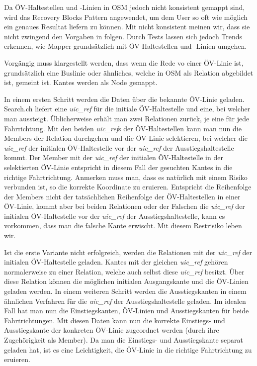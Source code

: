 Da ÖV-Haltestellen und -Linien in \ac{OSM} jedoch nicht konsistent gemappt sind, wird das Recovery Blocks Pattern \cite{fault_tolerant_software} angewendet, um dem User so oft wie möglich ein genaues Resultat liefern zu können. Mit nicht konsistent meinen wir, dass sie nicht zwingend den Vorgaben in \cite{osm_wiki_relation} folgen. Durch Tests lassen sich jedoch Trends erkennen, wie Mapper grundsätzlich mit ÖV-Haltestellen und -Linien umgehen.

Vorgängig muss klargestellt werden, dass wenn die Rede vo einer ÖV-Linie ist, grundsätzlich eine Buslinie oder ähnliches, welche in \ac{OSM} als Relation \cite{osm_wiki_relation} abgebildet ist, gemeint ist. \glspl{Kante} werden als Node gemappt.

In einem ersten Schritt werden die Daten über die bekannte ÖV-Linie geladen. Search.ch \cite{search_ch_route_api} liefert eine \emph{uic\_ref} für die initiale ÖV-Haltestelle und eine, bei welcher man aussteigt. Üblicherweise erhält man zwei Relationen zurück, je eine für jede Fahrrichtung. Mit den beiden \emph{uic\_ref}s der ÖV-Haltestellen kann man nun die Members der Relation durchgehen und die ÖV-Linie selektieren, bei welcher die \emph{uic\_ref} der initialen ÖV-Haltestelle vor der \emph{uic\_ref} der Ausstiegshaltestelle kommt. Der Member mit der \emph{uic\_ref} der initialen ÖV-Haltestelle in der selektierten ÖV-Linie entspricht in diesem Fall der gesuchten \glspl{Kante} in die richtige Fahrtrichtung.
Anmerken muss man, dass es natürlich mit einem Risiko verbunden ist, so die korrekte Koordinate zu eruieren. Entspricht die Reihenfolge der Members nicht der tatsächlichen Reihenfolge der ÖV-Haltestellen in einer ÖV-Linie, kommt aber bei beiden Relationen oder der Falschen die \emph{uic\_ref} der initialen ÖV-Haltestelle vor der \emph{uic\_ref} der Ausstiegshaltestelle, kann es vorkommen, dass man die falsche Kante erwischt. Mit diesem Restrisiko leben wir.

Ist die erste Variante nicht erfolgreich, werden die Relationen mit der \emph{uic\_ref} der initialen ÖV-Haltestelle geladen. \glspl{Kante} mit der gleichen \emph{uic\_ref} gehören normalerweise zu einer Relation, welche auch selbst diese \emph{uic\_ref} besitzt. Über diese Relation können die möglichen initialen Ausgangskante und die ÖV-Linien geladen werden. In einem weiteren Schritt werden die Ausstiegskanten in einem ähnlichen Verfahren für die \emph{uic\_ref} der Ausstiegshaltestelle geladen. Im idealen Fall hat man nun die Einstiegskanten, ÖV-Linien und Ausstiegskanten für beide Fahrtrichtungen. Mit diesen Daten kann nun die korrekte Einstiegs- und Ausstiegskante der konkreten ÖV-Linie zugeordnet werden (durch ihre Zugehörigkeit als Member). Da man die Einstiegs- und Ausstiegskante separat geladen hat, ist es eine Leichtigkeit, die ÖV-Linie in die richtige Fahrtrichtung zu eruieren.

